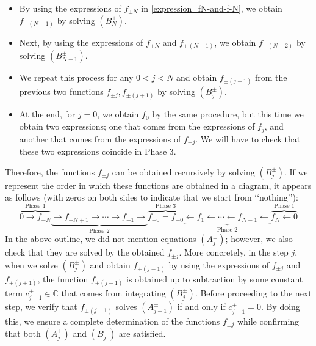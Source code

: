 \documentclass[12pt, pdflatex, a4paper]{article}
\theoremstyle{plain}
\theoremstyle{definition}
\def\C{{\mathbb C}}
\begin{document}
\begin{itemize}
\setlength{\itemsep}{1pt}
\item By using the expressions of $f_{\pm N}$ in \eqref{expression_fN-and-f-N}, we obtain $f_{\pm(N-1)}$ by solving $(B_{N}^\pm)$.

\item Next, by using the expressions of $f_{\pm N}$ and $f_{\pm(N-1)}$, we obtain $f_{\pm(N-2)}$ by solving $(B_{N-1}^\pm)$.

\item We repeat this process for any $0 < j < N$ and obtain $f_{\pm(j-1)}$ from the previous two functions $f_{\pm j}, f_{\pm (j+1)}$ by solving $(B_j^\pm)$.

\item At the end, for $j = 0$, we obtain $f_0$ by the same procedure, but this time we obtain two expressions; one that comes from the expressions of $f_j$, and another that comes from the expressions of $f_{-j}$. We will have to check that these two expressions coincide in Phase 3.
\end{itemize}
Therefore, the functions $f_{\pm j}$ can be obtained recursively by solving $(B_j^\pm)$. If we represent the order in which these functions are obtained in a diagram, it appears as follows (with zeros on both sides to indicate that we start from \lq\lq nothing\rq\rq):
\begin{equation}\label{diagram-simple}
\overbrace{0 \rightarrow f_{-N}}^\text{Phase 1} 
\underbrace{\rightarrow f_{-N+1} \rightarrow \cdots \rightarrow f_{-1} \rightarrow}_\text{Phase 2}
\overbrace{f_{-0} = f_{+0}}^\text{Phase 3}
\underbrace{\leftarrow f_1 \leftarrow \cdots \leftarrow f_{N-1} \leftarrow}_\text{Phase 2}
\overbrace{f_N \leftarrow 0}^\text{Phase 1}
\end{equation}
In the above outline, we did not mention equations $(A_j^\pm)$; however, we also check that they are solved by the obtained $f_{\pm j}$. More concretely, in the step $j$, when we solve $(B_j^\pm)$ and obtain $f_{\pm(j-1)}$ by using the expressions of $f_{\pm j}$ and $f_{\pm(j+1)}$, the function $f_{\pm(j-1)}$ is obtained up to subtraction by some constant term $c_{j-1}^\pm \in \C$ that comes from integrating $(B_j^\pm)$. Before proceeding to the next step, we verify that $f_{\pm(j-1)}$ solves $(A_{j-1}^\pm)$ if and only if $c_{j-1}^\pm = 0$. By doing this, we ensure a complete determination of the functions $f_{\pm j}$ while confirming that both $(A_j^\pm)$ and $(B_j^\pm)$ are satisfied.
\end{document}
